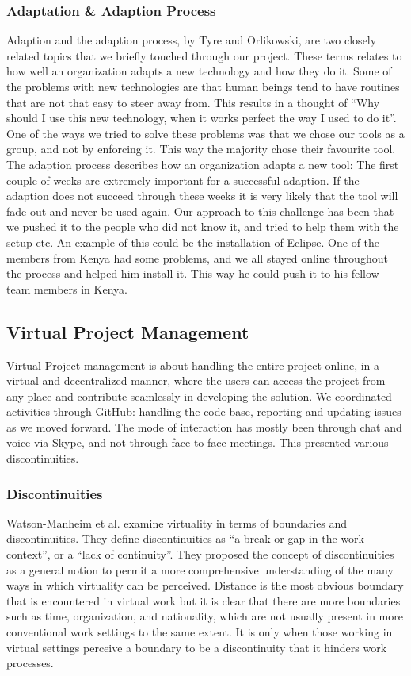 \subsubsection{Adaptation \& Adaption Process} \label{subsubsec:adaptationandadaptationprocess}
Adaption and the adaption process, by Tyre and Orlikowski, \cite{tyre1994windows} are two closely related topics that we briefly touched through our project. These terms relates to how well an organization adapts a new technology and how they do it. Some of the problems with new technologies are that human beings tend to have routines that are not that easy to steer away from. This results in a thought of ``Why should I use this new technology, when it works perfect the way I used to do it''. One of the ways we tried to solve these problems was that we chose our tools as a group, and not by enforcing it. This way the majority chose their favourite tool. The adaption process describes how an organization adapts a new tool: The first couple of weeks are extremely important for a successful adaption. If the adaption does not succeed through these weeks it is very likely that the tool will fade out and never be used again. Our approach to this challenge has been that we pushed it to the people who did not know it, and tried to help them with the setup etc. An example of this could be the installation of Eclipse. One of the members from Kenya had some problems, and we all stayed online throughout the process and helped him install it. This way he could push it to his fellow team members in Kenya.

\subsection{Virtual Project Management} \label{subsec:virtualprojectmanagement}
Virtual Project management is about handling the entire project online, in a virtual and decentralized manner, where the users can access the project from any place and contribute seamlessly in developing the solution. We coordinated activities through GitHub: handling the code base, reporting and updating issues as we moved forward. The mode of interaction has mostly been through chat and voice via Skype, and not through face to face meetings. This presented various discontinuities.

\subsubsection{Discontinuities} \label{subsubsec:discontinuities}
Watson-Manheim et al. \cite{watson2007distance} examine virtuality in terms of boundaries and discontinuities. They define discontinuities as “a break or gap in the work context”, or a “lack of continuity”. They proposed the concept of discontinuities as a general notion to permit a more comprehensive understanding of the many ways in which virtuality can be perceived.
Distance is the most obvious boundary that is encountered in virtual work but it is clear that there are more boundaries such as time, organization, and nationality, which are not usually present in more conventional work settings to the same extent. It is only when those working in virtual settings perceive a boundary to be a discontinuity that it hinders work processes. 

